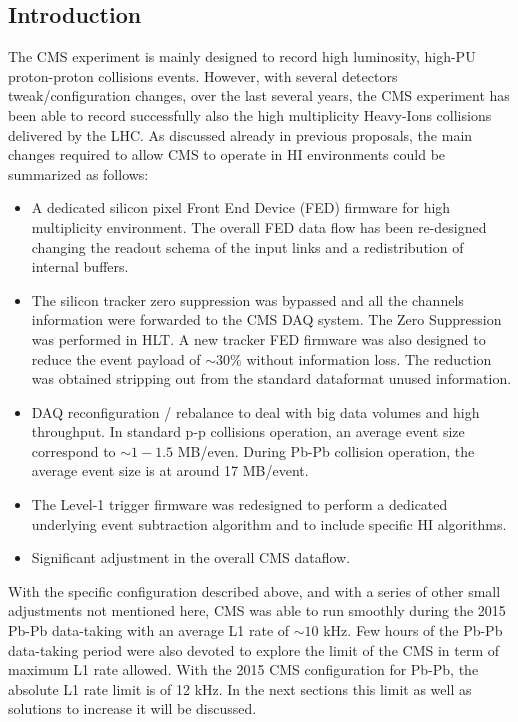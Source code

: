\subsection{Introduction\label{subsec:HWintro}}
The CMS experiment is mainly designed to record high luminosity, high-PU proton-proton collisions events.  However, with several detectors tweak/configuration changes, over the last several years, the CMS experiment has been able to record successfully also the high multiplicity Heavy-Ions collisions delivered by the LHC. As discussed already in previous
proposals, the main changes required to allow CMS to operate in HI environments could be summarized as follows:

\begin{itemize}
\item A dedicated silicon pixel Front End Device (FED) firmware for high multiplicity environment. The overall FED data flow has been re-designed changing the readout schema of the input links and a redistribution of internal buffers.
 
\item The silicon tracker zero suppression was bypassed and all the channels information were forwarded to the CMS DAQ system. The Zero Suppression was performed in HLT. A new tracker FED firmware was also designed to reduce the event payload of $\sim 30 \%$ without information loss. The reduction was obtained stripping out from the standard dataformat unused information.  

\item DAQ reconfiguration / rebalance to deal with big data volumes and high throughput. In standard p-p collisions operation, an average event size correspond to $\sim 1-1.5$ MB/even. During Pb-Pb collision operation, the average event size is at around 17 MB/event. 

\item The Level-1 trigger firmware was redesigned to perform a dedicated underlying event subtraction algorithm and to include specific HI algorithms.

\item Significant adjustment in the overall CMS dataflow.
\end{itemize}


With the specific configuration described above, and with a series of other small adjustments not mentioned here, CMS was able to run smoothly during the 2015 Pb-Pb data-taking with an average L1 rate of $\sim 10$ kHz. Few hours of the Pb-Pb data-taking
period were also devoted to explore the limit of the CMS in term of maximum L1 rate allowed.  With the 2015 CMS configuration for Pb-Pb, the absolute L1 rate limit is of 12 kHz. In the next sections this limit as well as solutions to increase it will be discussed. 

